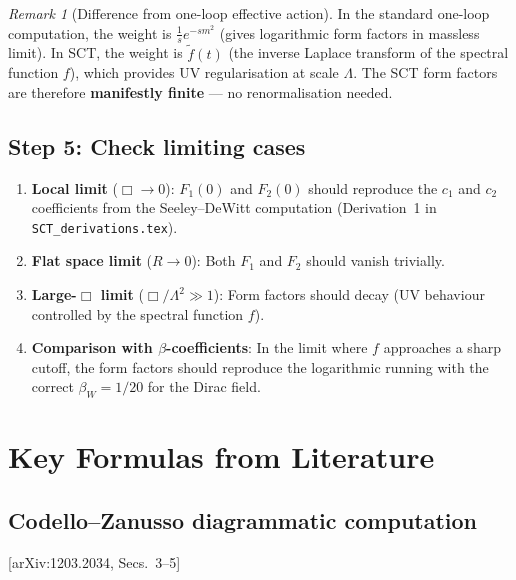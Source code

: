 \documentclass[12pt,a4paper]{article}
\theoremstyle{definition}
\theoremstyle{remark}
\newtheorem{remark}[proposition]{Remark}
\newcommand{\fromlit}[1]{\textcolor{blue!70!black}{\textsf{[#1]}}}
\begin{document}
\begin{remark}[Difference from one-loop effective action]
In the standard one-loop computation, the weight is
$\frac{1}{s}e^{-sm^2}$ (gives logarithmic form factors in massless limit).
In SCT, the weight is $\tilde{f}(t)$ (the inverse Laplace transform
of the spectral function $f$), which provides UV regularisation at
scale $\Lambda$.  The SCT form factors are therefore
\textbf{manifestly finite} --- no renormalisation needed.
\end{remark}


\subsection{Step 5: Check limiting cases}

\begin{enumerate}
\item \textbf{Local limit} ($\Box \to 0$):
  $F_1(0)$ and $F_2(0)$ should reproduce the $c_1$ and $c_2$ coefficients
  from the Seeley--DeWitt computation (Derivation~1 in
  \texttt{SCT\_derivations.tex}).

\item \textbf{Flat space limit} ($R \to 0$):
  Both $F_1$ and $F_2$ should vanish trivially.

\item \textbf{Large-$\Box$ limit} ($\Box/\Lambda^2 \gg 1$):
  Form factors should decay (UV behaviour controlled by the spectral
  function $f$).

\item \textbf{Comparison with $\beta$-coefficients}:
  In the limit where $f$ approaches a sharp cutoff, the form factors
  should reproduce the logarithmic running with the correct
  $\beta_W = 1/20$ for the Dirac field.
\end{enumerate}


\newpage
\section{Key Formulas from Literature}
\label{sec:key-formulas}

\subsection{Codello--Zanusso diagrammatic computation}

\fromlit{arXiv:1203.2034, Secs.~3--5}
\end{document}
